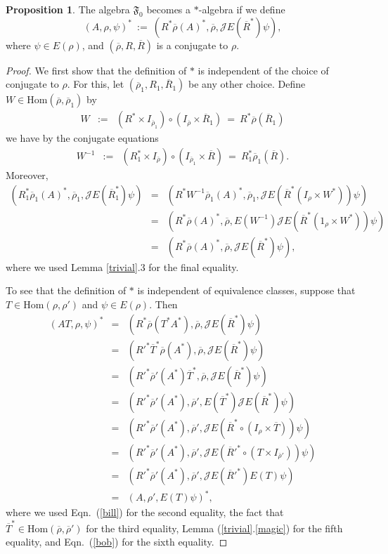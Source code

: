 \documentclass[11pt]{article}
\newcommand{\alg}[1]{\mathfrak{#1}}
\theoremstyle{definition}
\newtheorem{prop}[thm]{Proposition}
\theoremstyle{definition}
\theoremstyle{remark}
\def\2#1{{\mathcal #1}}
\def\ol#1{{\overline #1}}
\newcommand{\Hom}{\mathrm{Hom}}
\begin{document}
\begin{prop} \label{prop-starF}
The algebra $\alg{F}_0 $ becomes a $*$-algebra if we define
  \begin{equation} (A,\rho ,\psi )^* \: := \: (R^*\overline{\rho}(A)^*,\ol\rho
    ,\2JE(\overline{R}^*)\psi ) ,\end{equation} where $\psi \in E(\rho )$, and
  $(\overline{\rho},R,\overline{R})$ is a conjugate to $\rho$.
\end{prop}

\begin{proof} We first show that the definition of $*$ is independent of the choice
  of conjugate to $\rho$.  For this, let $(\overline{\rho}_1,R_1,\overline{R}_1)$ be
  any other choice.  Define $W\in \Hom (\ol\rho ,\ol\rho _1)$ by
  \begin{eqnarray} W &:=& (R^*\times I_{\overline{\rho} _1})\circ
    (I_{\overline{\rho}}\times \ol R_1) \: =\: R^*\overline{\rho}(\ol R_1)
  \end{eqnarray} we have by the conjugate equations
\begin{eqnarray*}
  W^{-1} & := & (R_1^*\times I_{\ol\rho}) \circ (I_{\ol\rho_1}\times \ol R) \:
  =\: R_1^*\ol\rho_1 (\ol R) .\end{eqnarray*} Moreover,
\begin{eqnarray*}
  (R_1^*\ol\rho _1(A)^*,\ol\rho _1,\2JE(\ol R_1^*)\psi ) &=& (R^*W^{-1}\ol\rho
  _1(A)^*,\ol\rho _1,\2JE(\ol
  R^*(I_{\rho}\times W^*))\psi )   \\ 
  &=&   (R^*\ol\rho (A)^*,\ol\rho ,E(W^{-1})\2JE(\ol R^*(1_{\rho}\times W^*))\psi ) \\
  &=& (R^*\ol\rho (A)^*,\ol\rho ,\2JE(\ol R^*)\psi ),\end{eqnarray*}
where we used Lemma \ref{trivial}.3 for the final equality.  

To see that the definition of $*$ is independent of equivalence classes, suppose that
$T\in \Hom (\rho ,\rho ')$ and $\psi \in E(\rho )$.  Then
\begin{eqnarray*} (AT,\rho ,\psi )^* &=& (R^*\ol\rho (T^*A^*),\ol\rho ,\2JE(\ol R^*)\psi ) \\
  &=& (R'^*\ol T^*\ol\rho (A^*),\ol\rho ,\2JE(\ol R^*)\psi ) \\
  &=& (R'^*\ol\rho '(A^*)\ol T^*,\ol\rho ,\2JE(\ol R^*)\psi ) \\
  &=& (R'^*\ol\rho '(A^*),\ol\rho ',E(\ol T^*)\2JE(\ol R^*)\psi ) \\
  &=& (R'^*\ol\rho '(A^*),\ol\rho ',\2JE(\ol R^*\circ (I_{\rho }\times \ol T))\psi )\\
  &=& (R'^*\ol\rho '(A^*),\ol\rho ',\2JE(\ol R'^*\circ (T\times I_{\ol\rho '}))\psi ) \\
  &=& (R'^*\ol\rho '(A^*),\ol\rho ',\2JE(\ol R'^*)E(T)\psi ) \\
  &=& (A,\rho ',E(T)\psi )^* , \end{eqnarray*} where we used Eqn.\ (\ref{bill}) for the
second equality, the fact that $\ol{T}^*\in \Hom (\ol\rho ,\ol\rho ')$ for the third
equality, Lemma (\ref{trivial}.\ref{magic}) for the fifth equality, and Eqn.\ (\ref{bob})
for the sixth equality.


\end{proof}
\end{document}
